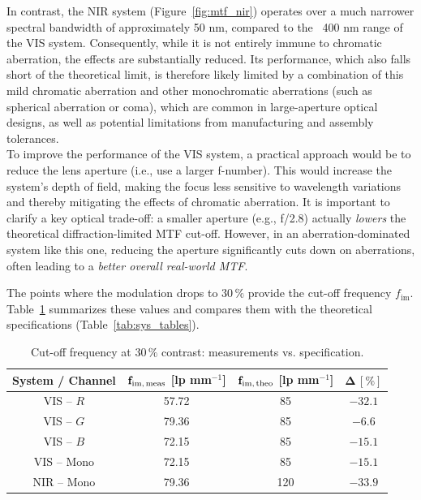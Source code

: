 \noindent In contrast, the NIR system (Figure~\ref{fig:mtf_nir}) operates over a much narrower spectral bandwidth of approximately 50 nm, compared to the ~400 nm range of the VIS system. Consequently, while it is not entirely immune to chromatic aberration, the effects are substantially reduced. Its performance, which also falls short of the theoretical limit, is therefore likely limited by a combination of this mild chromatic aberration and other monochromatic aberrations (such as spherical aberration or coma), which are common in large-aperture optical designs, as well as potential limitations from manufacturing and assembly tolerances.\\

\noindent To improve the performance of the VIS system, a practical approach would be to reduce the lens aperture (i.e., use a larger f-number). This would increase the system's depth of field, making the focus less sensitive to wavelength variations and thereby mitigating the effects of chromatic aberration. It is important to clarify a key optical trade-off: a smaller aperture (e.g., f/2.8) actually \textit{lowers} the theoretical diffraction-limited MTF cut-off. However, in an aberration-dominated system like this one, reducing the aperture significantly cuts down on aberrations, often leading to a \textit{better overall real-world MTF}. %

\noindent The points where the modulation drops to $30\,\%$ provide the cut-off frequency $f_{\text{im}}$. Table~\ref{tab:cutoff_meas} summarizes these values and compares them with the theoretical specifications (Table~\ref{tab:sys_tables}).\\

\begin{table}[H]
\centering
\caption{Cut-off frequency at $30\,\%$ contrast: measurements vs. specification.}
\label{tab:cutoff_meas}
\begin{tabular}{|c|c|c|c|}
    \hline
    \rowcolor[HTML]{EFEFEF}
    \textbf{System / Channel} &
    $\mathbf{f_{\text{im,\,meas}}}$ [lp mm$^{-1}$] &
    $\mathbf{f_{\text{im,\,theo}}}$ [lp mm$^{-1}$] &
    $\mathbf{\Delta\,[\%]}$ \\ \hline
    VIS – $R$     &   57.72 & 85  & $-32.1$ \\ \hline
    VIS – $G$     &   79.36 & 85  & $-6.6$ \\ \hline
    VIS – $B$     &   72.15 & 85  & $-15.1$ \\ \hline
    VIS – Mono      &   72.15 & 85  & $-15.1$ \\ \hline
    NIR – Mono      &   79.36 & 120 & $-33.9$ \\ \hline
\end{tabular}
\end{table}
